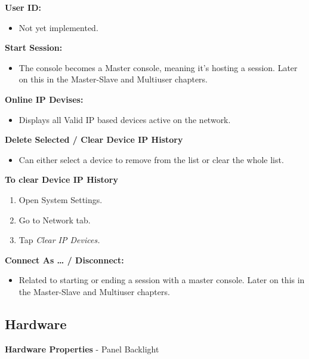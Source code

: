 \documentclass[
]{article}
\providecommand{\tightlist}{%
  \setlength{\itemsep}{0pt}\setlength{\parskip}{0pt}}
\begin{document}
\textbf{User ID:}

\begin{itemize}
\tightlist
\item
  {Not yet implemented}.
\end{itemize}

\textbf{Start Session:}

\begin{itemize}
\tightlist
\item
  The console becomes a Master console, meaning it's hosting a session. Later on this in the Master-Slave and Multiuser chapters.
\end{itemize}

\textbf{Online IP Devises:}

\begin{itemize}
\tightlist
\item
  Displays all Valid IP based devices active on the network.
\end{itemize}

\textbf{Delete Selected / Clear Device IP History}

\begin{itemize}
\tightlist
\item
  Can either select a device to remove from the list or clear the whole list.
\end{itemize}

\textbf{To clear Device IP History}

\begin{enumerate}
\def\labelenumi{\arabic{enumi}.}
\item
  Open System Settings.
\item
  Go to Network tab.
\item
  Tap \emph{Clear IP Devices.}
\end{enumerate}

\textbf{Connect As \ldots{} / Disconnect:}

\begin{itemize}
\tightlist
\item
  Related to starting or ending a session with a master console. Later on this in the Master-Slave and Multiuser chapters.
\end{itemize}

\hypertarget{hardware}{%
\subsection{Hardware}\label{hardware}}

\textbf{Hardware Properties} - Panel Backlight
\end{document}
